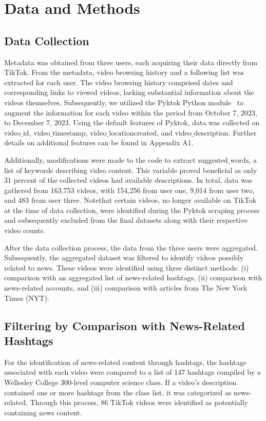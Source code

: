 \documentclass{article}
\begin{document}
\section{Data and Methods}
\subsection{Data Collection}
Metadata was obtained from three users, each acquiring their data directly from TikTok. From the metadata, video browsing history and a following list was extracted for each user. The video browsing history comprised dates and corresponding links to viewed videos, lacking substantial information about the videos themselves. Subsequently, we utilized the Pyktok Python module~\cite{pyktok} to augment the information for each video within the period from October 7, 2023, to December 7, 2023. Using the default features of Pyktok, data was collected on $\text{video\_id}$, $\text{video\_timestamp}$, $\text{video\_locationcreated}$, and $\text{video\_description}$. Further details on additional features can be found in Appendix A1.\newline

{\noindent}Additionally, modifications were made to the code to extract $\text{suggested\_words}$, a list of keywords describing video content. This variable proved beneficial as only 31 percent of the collected videos had available descriptions. In total, data was gathered from 163,753 videos, with 154,256 from user one, 9,014 from user two, and 483 from user three. Notethat certain videos, no longer available on TikTok at the time of data collection, were identified during the Pyktok scraping process and subsequently excluded from the final datasets along with their respective video counts.\newline

{\noindent}After the data collection process, the data from the three users were aggregated. Subsequently, the aggregated dataset was filtered to identify videos possibly related to news. These videos were identified using three distinct methods: (i) comparison with an aggregated list of news-related hashtags, (ii) comparison with news-related accounts, and (iii) comparison with articles from The New York Times (NYT).~\newline

\subsection{Filtering by Comparison with News-Related Hashtags}
For the identification of news-related content through hashtags, the hashtags associated with each video were compared to a list of 147 hashtags compiled by a Wellesley College 300-level computer science class. If a video's description contained one or more hashtags from the class list, it was categorized as news-related. Through this process, 86 TikTok videos were identified as  potentially containing news content.~\newline
\end{document}
